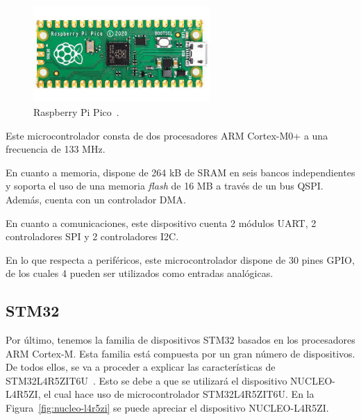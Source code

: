\begin{figure}[h]
    \centering
    \includegraphics[width=0.6\textwidth]{figures/raspberry-pico.jpeg}
    \caption{Raspberry Pi Pico~\cite{rp2040-img}.}
    \label{fig:raspberry-pico}
\end{figure}

Este microcontrolador consta de dos procesadores ARM Cortex-M0+ a una frecuencia de 133 MHz.

En cuanto a memoria, dispone de 264 kB de SRAM en seis bancos independientes y soporta el uso de una memoria \textit{flash} de 16 MB a través de un bus QSPI.
Además, cuenta con un controlador \ac{DMA}.

En cuanto a comunicaciones, este dispositivo cuenta 2 módulos \ac{UART}, 2 controladores \ac{SPI} y 2 controladores \ac{I2C}.

En lo que respecta a periféricos, este microcontrolador dispone de 30 pines \ac{GPIO}, de los cuales 4 pueden ser utilizados como entradas analógicas.


\subsection{STM32}\label{subsec:stm32}

Por último, tenemos la familia de dispositivos STM32 basados en los procesadores ARM Cortex-M.
Esta familia está compuesta por un gran número de dispositivos.
De todos ellos, se va a proceder a explicar las características de STM32L4R5ZIT6U~\cite{nucleo-spec}.
Esto se debe a que se utilizará el dispositivo NUCLEO-L4R5ZI, el cual hace uso de microcontrolador STM32L4R5ZIT6U.
En la Figura~\ref{fig:nucleo-l4r5zi} se puede apreciar el dispositivo NUCLEO-L4R5ZI.

